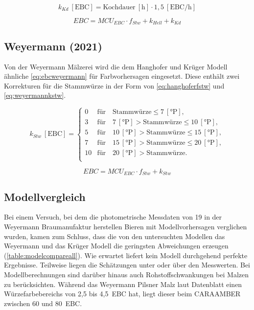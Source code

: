 \documentclass[a4paper,parskip=half]{scrartcl}
\newcommand{\MCUEBC}{\mathit{MCU}_{EBC}}
\newcommand{\EBC}{\mathit{EBC}}
\newcommand{\uebc}{\:[\textrm{EBC}]}
\newcommand{\uebch}{\:[\textrm{EBC/h}]}
\newcommand{\uplato}{\:[\textrm{°P}]}
\newcommand{\fstw}{f_{Stw}}
\newcommand{\khell}{k_{Hell}}
\newcommand{\kkd}{k_{Kd}}
\newcommand{\kstw}{k_{Stw}}
\newcommand{\uhour}{\:[\textrm{h}]}
\begin{document}
\begin{equation}
\kkd \uebc = \text{Kochdauer} \uhour \cdot 1,5 \uebch
\label{eq:krugerkkd}
\end{equation}

\begin{equation}
\EBC = \MCUEBC \cdot \fstw + \khell + \kkd
\label{eq:ebckruger}
\end{equation}

\subsection*{Weyermann (2021)}

Von der Weyermann Mälzerei wird die dem Hanghofer und Krüger Modell ähnliche \autoref{eq:ebcweyermann} für Farbvorhersagen eingesetzt. Diese enthält zwei Korrekturen für die Stammwürze in der Form von \autoref{eq:hanghoferfstw} und \autoref{eq:weyermannkstw}. \parencite{KrausWeyermann2021b}

\begin{equation}
\kstw \uebc = \begin{cases}
0  & \text{für} \quad \text{Stammwürze} \le 7 \uplato, \\
3  & \text{für} \quad 7 \uplato > \text{Stammwürze} \le 10 \uplato, \\
5  & \text{für} \quad 10 \uplato > \text{Stammwürze} \le 15 \uplato, \\
7  & \text{für} \quad 15 \uplato > \text{Stammwürze} \le 20 \uplato, \\
10 & \text{für} \quad 20 \uplato > \text{Stammwürze}. \\
\end{cases}
\label{eq:weyermannkstw}
\end{equation}

\begin{equation}
\EBC = \MCUEBC \cdot \fstw + \kstw
\label{eq:ebcweyermann}
\end{equation}

\subsection*{Modellvergleich}

Bei einem Versuch, bei dem die photometrische Messdaten von 19 in der Weyermann Braumanufaktur herstellen Bieren mit Modellvorhersagen verglichen wurden, kamen \textcite{KrausWeyermann2021b} zum Schluss, dass die von den untersuchten Modellen das Weyermann und das Krüger Modell die geringsten Abweichungen erzeugen (\autoref{table:modelcompareall}). Wie erwartet liefert kein Modell durchgehend perfekte Ergebnisse. Teilweise liegen die Schätzungen unter oder über den Messwerten. Bei Modellberechnungen sind darüber hinaus auch Rohstoffschwankungen bei Malzen zu berücksichten. Während das Weyermann Pilsner Malz laut Datenblatt einen Würzefarbebereichs von 2,5 bis 4,5~EBC hat, liegt dieser beim CARAAMBER zwischen 60 und 80~EBC.
\end{document}
